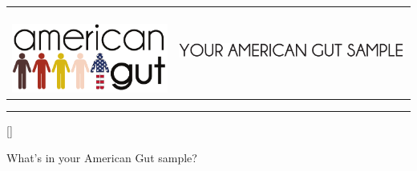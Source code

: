 \documentclass[landscape]{article}
\begin{document}
\begin{tabular}{ m{4.4cm} m{16cm} }  %
	~~\includegraphics[height=0.08\textheight]{pdfs-gut/logoshape.pdf} & \includegraphics[height=0.065\textheight]{pdfs-gut/youramericangutsampletext.pdf} \\
\end{tabular}

\hrule

\vspace{0.65cm}

\begin{center}

\StrLen{\yourname}[\yournameLen]


\end{center}

\vspace{0.65cm}

{\huge What's in your American Gut sample?}

\vspace{2mm}
\end{document}
